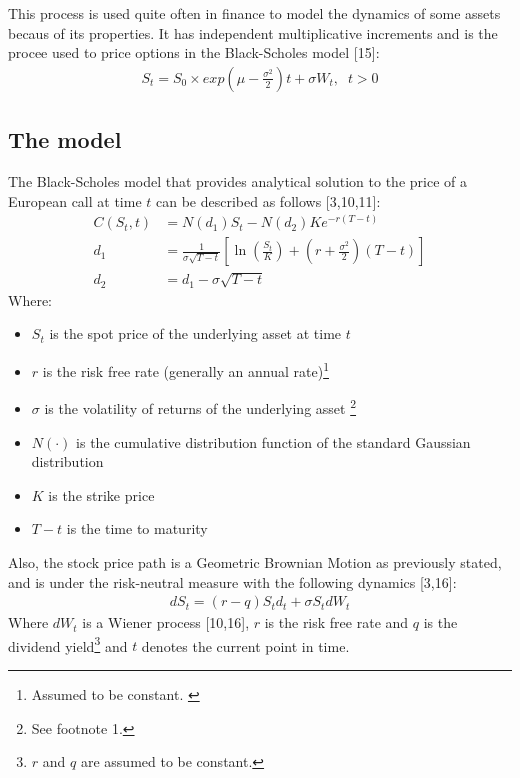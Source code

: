 \documentclass[12pt,twoside]{reedthesis}
\providecommand{\tightlist}{%
  \setlength{\itemsep}{0pt}\setlength{\parskip}{0pt}}
\theoremstyle{definition}
\theoremstyle{definition}
\theoremstyle{remark}
\begin{document}
  This process is used quite often in finance to model the dynamics of
  some assets becaus of its properties. It has independent multiplicative
  increments and is the procee used to price options in the Black-Scholes
  model {[}15{]}:
  \begin{align}
  S_t = S_0 \times exp{\left(\mu - \frac{\sigma^2}{2} \right) t + \sigma W_t}, \;\; t > 0
  \end{align}
  \subsection{The model}\label{the-model}
  
  The Black-Scholes model that provides analytical solution to the price
  of a European call at time \(t\) can be described as follows
  {[}3,10,11{]}:
  \begin{align}
  C(S_{t},t)&=N(d_{1})S_{t}-N(d_{2})Ke^{-r(T-t)}\\[10pt]
  d_{1}&={\frac {1}{\sigma {\sqrt {T-t}}}}\left[\ln \left({\frac {S_{t}}{K}}\right)+\left(r+{\frac {\sigma ^{2}}{2}}\right)(T-t)\right]\\[10pt]
  d_{2}&=d_{1}-\sigma {\sqrt {T-t}}
  \end{align}
  \noindent
  Where:
  \begin{itemize}
  \tightlist
  \item
    \(S_{t}\) is the spot price of the underlying asset at time \(t\)
  \item
    \(r\) is the risk free rate (generally an annual
    rate)\footnote{Assumed to be constant. \label{teste}}
  \item
    \(\sigma\) is the volatility of returns of the underlying asset
    \footnote{See footnote 1.}
  \item
    \(N(\cdot )\) is the cumulative distribution function of the standard
    Gaussian distribution
  \item
    \(K\) is the strike price
  \item
    \(T-t\) is the time to maturity
  \end{itemize}
  \noindent
  Also, the stock price path is a Geometric Brownian Motion as previously
  stated, and is under the risk-neutral measure with the following
  dynamics {[}3,16{]}:
  \begin{align}
  dS_{t} = (r-q)S_td_t+\sigma S_t dW_t
  \end{align}
  \noindent
  Where \(dW_t\) is a Wiener process {[}10,16{]}, \(r\) is the risk free
  rate and \(q\) is the dividend
  yield\footnote{$r$ and $q$ are assumed to be constant.} and \(t\)
  denotes the current point in time.
  
\end{document}
